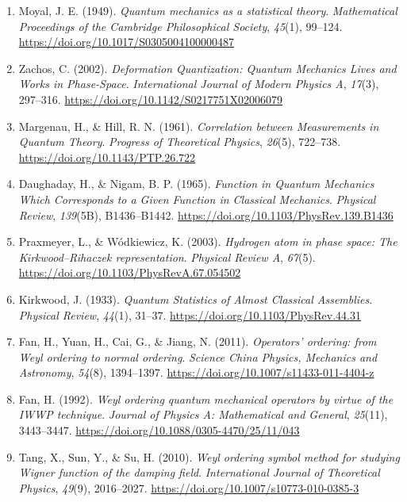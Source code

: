{\begin{enumerate}
		\item Moyal, J. E. (1949). \textit{Quantum mechanics as a statistical theory}. \textit{Mathematical Proceedings of the Cambridge Philosophical Society}, \textit{45}(1), 99--124. \url{https://doi.org/10.1017/S0305004100000487}
		
		\item Zachos, C. (2002). \textit{Deformation Quantization: Quantum Mechanics Lives and Works in Phase-Space}. \textit{International Journal of Modern Physics A}, \textit{17}(3), 297--316. \url{https://doi.org/10.1142/S0217751X02006079}
		
		\item Margenau, H., \& Hill, R. N. (1961). \textit{Correlation between Measurements in Quantum Theory}. \textit{Progress of Theoretical Physics}, \textit{26}(5), 722--738. \url{https://doi.org/10.1143/PTP.26.722}
		
		\item Daughaday, H., \& Nigam, B. P. (1965). \textit{Function in Quantum Mechanics Which Corresponds to a Given Function in Classical Mechanics}. \textit{Physical Review}, \textit{139}(5B), B1436--B1442. \url{https://doi.org/10.1103/PhysRev.139.B1436}
		
		\item Praxmeyer, L., \& Wódkiewicz, K. (2003). \textit{Hydrogen atom in phase space: The Kirkwood--Rihaczek representation}. \textit{Physical Review A}, \textit{67}(5). \url{https://doi.org/10.1103/PhysRevA.67.054502}
		
		\item Kirkwood, J. (1933). \textit{Quantum Statistics of Almost Classical Assemblies}. \textit{Physical Review}, \textit{44}(1), 31--37. \url{https://doi.org/10.1103/PhysRev.44.31}
		
		\item Fan, H., Yuan, H., Cai, G., \& Jiang, N. (2011). \textit{Operators' ordering: from Weyl ordering to normal ordering}. \textit{Science China Physics, Mechanics and Astronomy}, \textit{54}(8), 1394--1397. \url{https://doi.org/10.1007/s11433-011-4404-z}
		
		\item Fan, H. (1992). \textit{Weyl ordering quantum mechanical operators by virtue of the IWWP technique}. \textit{Journal of Physics A: Mathematical and General}, \textit{25}(11), 3443--3447. \url{https://doi.org/10.1088/0305-4470/25/11/043}
		
		\item Tang, X., Sun, Y., \& Su, H. (2010). \textit{Weyl ordering symbol method for studying Wigner function of the damping field}. \textit{International Journal of Theoretical Physics}, \textit{49}(9), 2016--2027. \url{https://doi.org/10.1007/s10773-010-0385-3}
		

\end{enumerate}}
